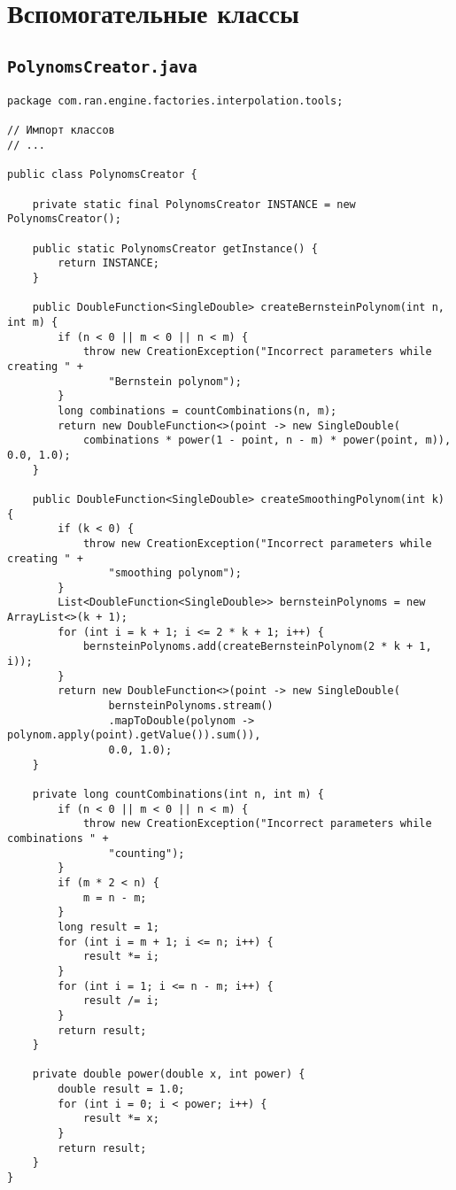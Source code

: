 \chapter{Вспомогательные классы}

\section*{\texttt{PolynomsCreator.java}}
\begin{verbatim}
package com.ran.engine.factories.interpolation.tools;

// Импорт классов
// ...

public class PolynomsCreator {

    private static final PolynomsCreator INSTANCE = new PolynomsCreator();

    public static PolynomsCreator getInstance() {
        return INSTANCE;
    }

    public DoubleFunction<SingleDouble> createBernsteinPolynom(int n, int m) {
        if (n < 0 || m < 0 || n < m) {
            throw new CreationException("Incorrect parameters while creating " +
                "Bernstein polynom");
        }
        long combinations = countCombinations(n, m);
        return new DoubleFunction<>(point -> new SingleDouble(
            combinations * power(1 - point, n - m) * power(point, m)), 0.0, 1.0);
    }

    public DoubleFunction<SingleDouble> createSmoothingPolynom(int k) {
        if (k < 0) {
            throw new CreationException("Incorrect parameters while creating " +
                "smoothing polynom");
        }
        List<DoubleFunction<SingleDouble>> bernsteinPolynoms = new ArrayList<>(k + 1);
        for (int i = k + 1; i <= 2 * k + 1; i++) {
            bernsteinPolynoms.add(createBernsteinPolynom(2 * k + 1, i));
        }
        return new DoubleFunction<>(point -> new SingleDouble(
                bernsteinPolynoms.stream()
                .mapToDouble(polynom -> polynom.apply(point).getValue()).sum()),
                0.0, 1.0);
    }

    private long countCombinations(int n, int m) {
        if (n < 0 || m < 0 || n < m) {
            throw new CreationException("Incorrect parameters while combinations " +
                "counting");
        }
        if (m * 2 < n) {
            m = n - m;
        }
        long result = 1;
        for (int i = m + 1; i <= n; i++) {
            result *= i;
        }
        for (int i = 1; i <= n - m; i++) {
            result /= i;
        }
        return result;
    }

    private double power(double x, int power) {
        double result = 1.0;
        for (int i = 0; i < power; i++) {
            result *= x;
        }
        return result;
    }
}
\end{verbatim}

